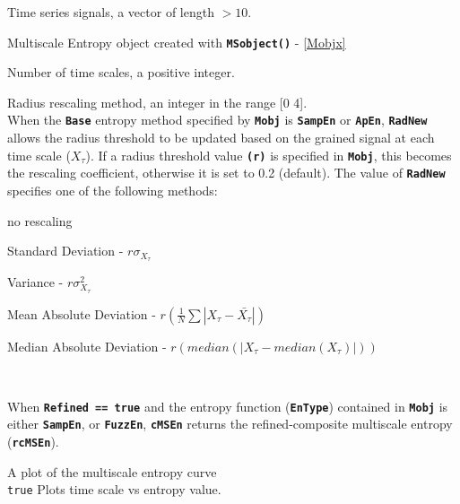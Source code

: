 \documentclass[12pt, a4paper, titlepage, openany]{book}
\begin{document}
\begin{description}[labelsep=1cm, labelwidth=2cm, nosep, style=multiline,leftmargin=3cm]\footnotesize
\item[\texttt{Sig}]		Time series signals, a vector of length $> 10$.
\item[\texttt{Mobj}]	Multiscale Entropy object created with \texttt{\textbf{MSobject()}} - \ref{Mobjx}
\item[\texttt{Scales}]		Number of time scales, a positive integer.
\item[\texttt{RadNew}]			Radius rescaling method, an integer in the range [0 4].\\
				 When the \texttt{\textbf{Base}} entropy method specified by \texttt{\textbf{Mobj}} is \texttt{\textbf{SampEn}} or \texttt{\textbf{ApEn}}, \texttt{\textbf{RadNew}} allows the radius threshold to be updated based on the grained signal at each time scale ($X_\tau$). If a radius threshold value \texttt{\textbf{(r)}} is specified in \texttt{\textbf{Mobj}},  this becomes the rescaling coefficient, otherwise it is set to 0.2 (default). The value of \texttt{\textbf{RadNew}} specifies one of the following methods:
	\begin{description}[labelsep=5em, labelwidth=4em, nosep,style=multiline,leftmargin=2cm]
		\item[0]	no rescaling
		\item[1]    Standard Deviation          - $r\sigma_{X_\tau}$
        \item[2]    Variance                    - $r\sigma_{X_\tau}^2$
        \item[3]    Mean Absolute Deviation     - $r(\frac{1}{N} \sum |X_{\tau} - \bar{X_{\tau}}|) $
        \item[4]    Median Absolute Deviation   - $r(median(|X_{\tau} - median(X_{\tau})|)) $
	\end{description}
\ \\ 
\item[\texttt{Refined}]	 When \textbf{\texttt{Refined == true}} and the entropy function (\textbf{\texttt{EnType}}) contained in  \textbf{\texttt{Mobj}} is either \texttt{\textbf{SampEn}}, or \texttt{\textbf{FuzzEn}}, \texttt{\textbf{cMSEn}} returns the refined-composite multiscale entropy (\texttt{\textbf{rcMSEn}}). \indent \cite{cMS2}  \cite{cMS3}
\item[\texttt{Plotx}]		A plot of the multiscale entropy curve\\
							\texttt{true} \hspace{15pt} Plots time scale vs entropy value.\\

\end{description}
\end{document}
